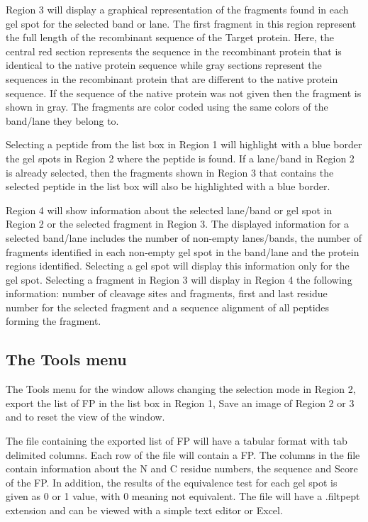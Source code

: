 Region \num{3} will display a graphical representation of the fragments found in each gel spot for the selected band or lane. The first fragment in this region represent the full length of the recombinant sequence of the Target protein. Here, the central red section represents the sequence in the recombinant protein that is identical to the native protein sequence while gray sections represent the sequences in the recombinant protein that are different to the native protein sequence.  If the sequence of the native protein was not given then the fragment is shown in gray. The fragments are color coded using the same colors of the band/lane they belong to.

Selecting a peptide from the list box in Region \num{1} will highlight with a blue border the gel spots in Region \num{2} where the peptide is found. If a lane/band in Region \num{2} is already selected, then the fragments shown in Region \num{3} that contains the selected peptide in the list box will also be highlighted with a blue border.

Region \num{4} will show information about the selected lane/band or gel spot in Region \num{2} or the selected fragment in Region \num{3}. The displayed information for a selected band/lane includes the number of non-empty lanes/bands, the number of fragments identified in each non-empty gel spot in the band/lane and the protein regions identified. Selecting a gel spot will display this information only for the gel spot. Selecting a fragment in Region \num{3} will display in Region \num{4} the following information: number of cleavage sites and fragments, first and last residue number for the selected fragment and a sequence alignment of all peptides forming the fragment.  

\subsection{The Tools menu}
\label{subsec:limprotToolsMenu}

The Tools menu for the window allows changing the selection mode in Region \num{2}, export the list of FP in the list box in Region \num{1}, Save an image of Region \num{2} or \num{3} and to reset the view of the window.

The file containing the exported list of FP will have a tabular format with tab delimited columns. Each row of the file will contain a FP. The columns in the file contain information about the N and C residue numbers, the sequence and Score of the FP. In addition, the results of the equivalence test for each gel spot is given as 0 or 1 value, with 0 meaning not equivalent. The file will have a .filtpept extension and can be viewed with a simple text editor or Excel.